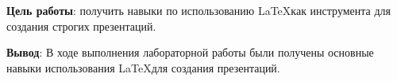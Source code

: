 \documentclass[a4paper,14pt]{article}
\begin{document}

\large{
    \par \textbf{Цель работы}: получить навыки по использованию \LaTeX как инструмента для создания строгих презентаций.

    \bigskip
    \texttt{}
    \bigskip

    

    \large{
        \par \textbf{Вывод}: В ходе выполнения лабораторной работы были получены основные навыки использования \LaTeX для создания презентаций.
    }
}
\end{document}
